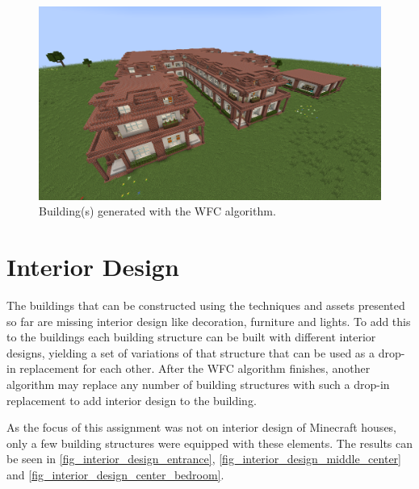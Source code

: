 \documentclass[
oneside,
fontsize=11pt
]{scrartcl}
\begin{document}
\begin{figure}[ht]
  \includegraphics[width=\textwidth]{images/buildings/generated_building_wfc.png}
  \caption{Building(s) generated with the WFC algorithm.}
  \label{fig_generated_building}
\end{figure}


\section{Interior Design}

The buildings that can be constructed using the techniques and assets presented so far
are missing interior design like decoration, furniture and lights. 
To add this to the buildings each building structure can be built with different interior designs,
yielding a set of variations of that structure that can be used as a drop-in replacement for each other.
After the WFC algorithm finishes, another algorithm may replace any number of building structures 
with such a drop-in replacement to add interior design to the building. 

As the focus of this assignment was not on interior design of Minecraft houses, 
only a few building structures were equipped with these elements. 
The results can be seen in 
\autoref{fig_interior_design_entrance}, \autoref{fig_interior_design_middle_center} and 
\autoref{fig_interior_design_center_bedroom}. 
\end{document}
